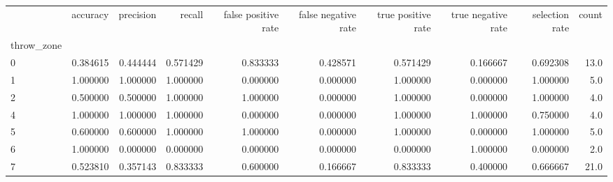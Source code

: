 \begin{tabular}{lrrrrrrrrr}
\toprule
{} &  accuracy &  precision &    recall &  false positive rate &  false negative rate &  true positive rate &  true negative rate &  selection rate &  count \\
throw\_zone &           &            &           &                      &                      &                     &                     &                 &        \\
\midrule
0          &  0.384615 &   0.444444 &  0.571429 &             0.833333 &             0.428571 &            0.571429 &            0.166667 &        0.692308 &   13.0 \\
1          &  1.000000 &   1.000000 &  1.000000 &             0.000000 &             0.000000 &            1.000000 &            0.000000 &        1.000000 &    5.0 \\
2          &  0.500000 &   0.500000 &  1.000000 &             1.000000 &             0.000000 &            1.000000 &            0.000000 &        1.000000 &    4.0 \\
4          &  1.000000 &   1.000000 &  1.000000 &             0.000000 &             0.000000 &            1.000000 &            1.000000 &        0.750000 &    4.0 \\
5          &  0.600000 &   0.600000 &  1.000000 &             1.000000 &             0.000000 &            1.000000 &            0.000000 &        1.000000 &    5.0 \\
6          &  1.000000 &   0.000000 &  0.000000 &             0.000000 &             0.000000 &            0.000000 &            1.000000 &        0.000000 &    2.0 \\
7          &  0.523810 &   0.357143 &  0.833333 &             0.600000 &             0.166667 &            0.833333 &            0.400000 &        0.666667 &   21.0 \\
\bottomrule
\end{tabular}
